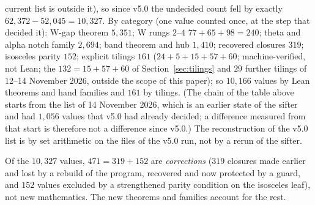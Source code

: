 \documentclass[11pt,reqno]{amsart}
\theoremstyle{plain}
\theoremstyle{definition}
\begin{document}
current list is outside it), so since v5.0 the undecided count fell by exactly $62{,}372-52{,}045=10{,}327$. By category
(one value counted once, at the step that decided it): W-gap theorem $5{,}351$; W rungs $2$--$4$ $77+65+98=240$;
theta and alpha notch family $2{,}694$; band theorem and hub $1{,}410$; recovered closures $319$; isosceles parity $152$;
explicit tilings $161$ ($24+5+15+57+60$; machine-verified, not Lean; the $132=15+57+60$ of Section~\ref{sec:tilings} and $29$ further tilings of
12--14 November 2026, outside the scope of this paper); so
$10{,}166$ values by Lean theorems and hand families and $161$ by tilings. (The chain of the table above starts from the
list of 14 November 2026, which is an earlier state of the sifter and had $1{,}056$ values that v5.0 had already decided;
a difference measured from that start is therefore not a difference since v5.0.) The reconstruction of the v5.0 list is by
set arithmetic on the files of the v5.0 run, not by a rerun of the sifter.

Of the $10{,}327$ values, $471=319+152$ are \emph{corrections} ($319$ closures made earlier and lost by a rebuild of the
program, recovered and now protected by a guard, and $152$ values excluded by a strengthened parity condition on the isosceles
leaf), not new mathematics. The new theorems and families account for the rest.
\end{document}
